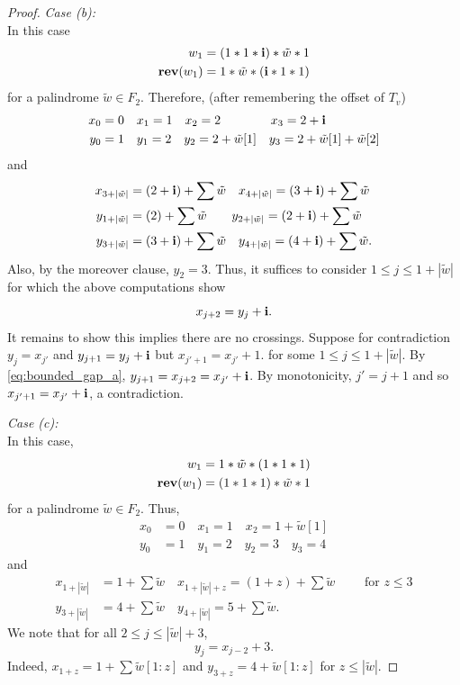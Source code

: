 \documentclass[12pt]{amsart}
\begin{document}
\begin{proof}
	
	{\it Case (b):} \\
	In this case 
	\begin{align*}
	w_1  &= (1*1*\mathbf{i})*\tilde{w}*1 \\ 
	\mathop{\bf rev}(w_1) &= 1*\tilde{w}*(\mathbf{i}*1*1)
	\end{align*}
	for a palindrome $\tilde{w} \in F_2$.
	Therefore, (after remembering the offset of $T_v$)
	\begin{align*}
	x_0 &= 0  \quad x_1 =1 \quad x_2 = 2 \qquad\qquad x_3 = 2 + \mathbf{i} \\
	y_0 &= 1 \quad y_1 = 2 \quad  y_2 = 2 + \tilde{w}[1] \quad y_3 = 2 + \tilde{w}[1] + \tilde{w}[2]
	\end{align*}
	and
	\begin{align*}
	x_{3 + |\tilde{w}|} &= (2 + \mathbf{i}) + \sum \tilde{w}  \quad x_{4 + |\tilde{w}|} = (3 + \mathbf{i}) + \sum \tilde{w} \\
	y_{1+ |\tilde{w}|} &= (2) + \sum \tilde{w} \qquad y_{2+ |\tilde{w}|} = (2+ \mathbf{i}) + \sum \tilde{w} \\
	y_{3+ |\tilde{w}|} &= (3+ \mathbf{i}) + \sum \tilde{w} \quad y_{4+ |\tilde{w}|} = (4+ \mathbf{i}) + \sum \tilde{w}.
	\end{align*}
	Also, by the moreover clause, $y_2 = 3$. 
	Thus, it suffices to consider $1 \leq j \leq 1 + |\tilde{w}|$
	for which the above computations show 
	\begin{equation} \label{eq:bounded_gap_a}
	x_{j+2} = y_{j} + \mathbf{i}.
	\end{equation}
	It remains to show this implies there are no crossings. Suppose for contradiction $y_{j} = x_{j'}$ and $y_{j+1} = y_j + \mathbf{i}$
	but $x_{j'+1} = x_{j'} + 1$. 
	for some $1 \leq j \leq 1 + |\tilde{w}|$. By \eqref{eq:bounded_gap_a}, $y_{j+1} = x_{j+2} = x_{j'} + \mathbf{i}$. By monotonicity, $j' = j+1$
	and so $x_{j'+1} = x_{j'}+ \mathbf{i}$, a contradiction.  
	
	{\it Case (c):} \\
	In this case, 
	\begin{align*}
	w_1  &= 1*\tilde{w}*(1*1*1) \\ 
	\mathop{\bf rev}(w_1) &= (1*1*1)*\tilde{w}*1
	\end{align*}
	for a palindrome $\tilde{w} \in F_2$.
	Thus, 
	\begin{align*}
	x_0 &= 0  \quad x_1 = 1  \quad x_2 = 1+\tilde{w}[1]\\
	y_0 &= 1 \quad y_1 = 2 \quad  y_2 = 3 \quad y_3 = 4
	\end{align*}
	and 
	\begin{align*}
	x_{1+|\tilde{w}|} &= 1 + \sum \tilde{w}  \quad x_{1+|\tilde{w}|+z} = (1+z) + \sum \tilde{w} \qquad \mbox{ for $z \leq 3$}\\
	y_{3+|\tilde{w}|} &= 4 + \sum \tilde{w}  \quad y_{4 + |\tilde{w}|} = 5 + \sum \tilde{w}.
	\end{align*}
	We note that for all $2 \leq j \leq |\tilde{w}| + 3$, 
	\begin{equation} \label{eq:bounded_gap_b}
	y_{j} = x_{j-2} + 3.
	\end{equation}
	Indeed, $x_{1+z} = 1 + \sum \tilde{w}[1:z]$ and $y_{3 + z} = 4 + \tilde{w}[1:z]$ for $z \leq |\tilde{w}|$. 
	

\end{proof}
\end{document}
